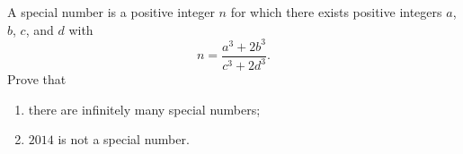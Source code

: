 A special number is a positive integer $n$ for which there exists positive integers $a$,  $b$,  $c$,  and $d$ with \[ n = \frac {a^3 + 2b^3} {c^3 + 2d^3}. \] Prove that
\begin{enumerate}[label = (\alph*)]
	\item there are infinitely many special numbers;
	\item $2014$ is not a special number.
\end{enumerate}
